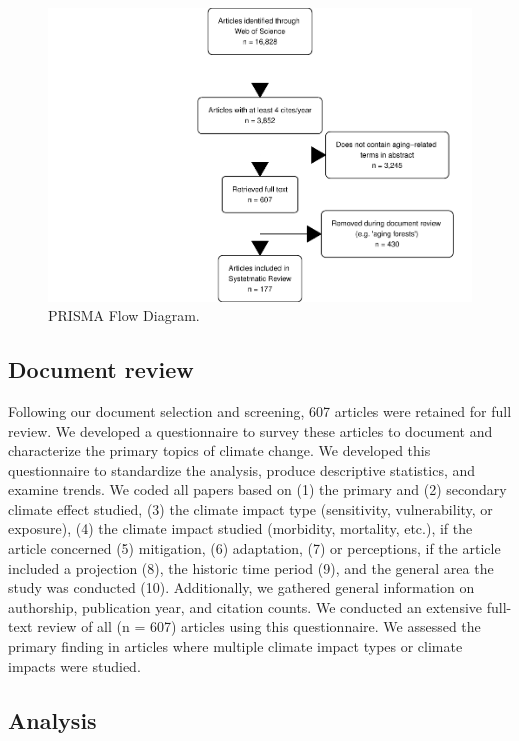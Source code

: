 \documentclass[12pt]{article}
\begin{document}
\begin{figure}
\centering
\includegraphics{MainDocument_files/figure-latex/figureflowdiagram-1.pdf}
\caption{PRISMA Flow Diagram. \label{fig-diagram}}
\end{figure}

\hypertarget{document-review}{%
\subsection{Document review}\label{document-review}}

Following our document selection and screening, 607 articles were
retained for full review. We developed a questionnaire to survey these
articles to document and characterize the primary topics of climate
change. We developed this questionnaire to standardize the analysis,
produce descriptive statistics, and examine trends. We coded all papers
based on (1) the primary and (2) secondary climate effect studied, (3)
the climate impact type (sensitivity, vulnerability, or exposure), (4)
the climate impact studied (morbidity, mortality, etc.), if the article
concerned (5) mitigation, (6) adaptation, (7) or perceptions, if the
article included a projection (8), the historic time period (9), and the
general area the study was conducted (10). Additionally, we gathered
general information on authorship, publication year, and citation
counts. We conducted an extensive full-text review of all (n = 607)
articles using this questionnaire. We assessed the primary finding in
articles where multiple climate impact types or climate impacts were
studied.

\hypertarget{analysis}{%
\subsection{Analysis}\label{analysis}}
\end{document}
